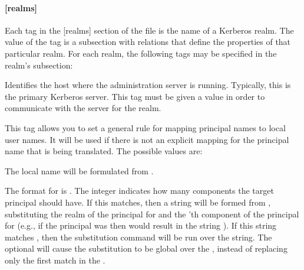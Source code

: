 \documentclass[letterpaper,10pt,english]{sphinxmanual}
\begin{document}
\paragraph{{[}realms{]}}
\label{\detokenize{admin/conf_files/krb5_conf:realms}}\label{\detokenize{admin/conf_files/krb5_conf:id2}}
\sphinxAtStartPar
Each tag in the {[}realms{]} section of the file is the name of a Kerberos
realm.  The value of the tag is a subsection with relations that
define the properties of that particular realm.  For each realm, the
following tags may be specified in the realm’s subsection:
\begin{description}
\sphinxAtStartPar
Identifies the host where the administration server is running.
Typically, this is the primary Kerberos server.  This tag must be
given a value in order to communicate with the {\hyperref[\detokenize{admin/admin_commands/kadmind:kadmind-8}]{}}
server for the realm.

\sphinxAtStartPar
This tag allows you to set a general rule for mapping principal
names to local user names.  It will be used if there is not an
explicit mapping for the principal name that is being
translated. The possible values are:
\begin{description}
\sphinxAtStartPar
The local name will be formulated from .

\sphinxAtStartPar
The format for  is \sphinxstylestrong{{[}}\sphinxstylestrong{:}\sphinxstylestrong{{]}(}\sphinxstylestrong{/}.
The integer  indicates how many components the target
principal should have.  If this matches, then a string will be
formed from , substituting the realm of the principal
for  and the ’th component of the principal for
 (e.g., if the principal was  then
\sphinxcode{\sphinxupquote{{[}2:\$2\$1foo{]}}} would result in the string
).  If this string matches , then
the  substitution command will be run over the
string.  The optional  will cause the substitution to be
global over the , instead of replacing only the first
match in the .


\end{description}
\end{description}
\end{document}
